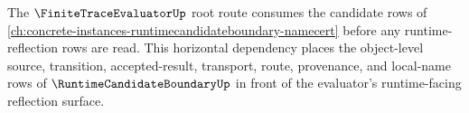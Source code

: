 The $\FiniteTraceEvaluatorUp$ root route consumes the candidate rows of \autoref{ch:concrete-instances-runtimecandidateboundary-namecert} before any runtime-reflection rows are read. This horizontal dependency places the object-level source, transition, accepted-result, transport, route, provenance, and local-name rows of $\RuntimeCandidateBoundaryUp$ in front of the evaluator's runtime-facing reflection surface.
